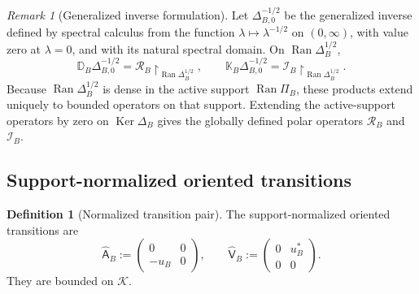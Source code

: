\documentclass[11pt,reqno]{scrartcl}
\newcommand{\scrK}{\mathscr K}
\newcommand{\Aop}{\mathsf A}
\newcommand{\Vop}{\mathsf V}
\newcommand{\DB}{\mathbb D}
\newcommand{\KB}{\mathbb K}
\newcommand{\DeltaB}{\Delta}
\DeclareMathOperator{\Ran}{Ran}
\DeclareMathOperator{\Ker}{Ker}
\newcommand{\restr}[2]{#1\!\upharpoonright_{#2}}
\theoremstyle{plain}
\theoremstyle{definition}
\newtheorem{definition}[definition]{Definition}
\theoremstyle{remark}
\newtheorem{remark}[remark]{Remark}
\begin{document}
\begin{remark}[Generalized inverse formulation]
Let \(\DeltaB_{B,0}^{-1/2}\) be the generalized inverse defined by spectral
calculus from the function \(\lambda\mapsto\lambda^{-1/2}\) on
\((0,\infty)\), with value zero at \(\lambda=0\), and with its natural
spectral domain.  On \(\Ran\DeltaB_B^{1/2}\),
\begin{equation}
  \DB_B\DeltaB_{B,0}^{-1/2}=\restr{\mathcal R_B}{\Ran\DeltaB_B^{1/2}},
  \qquad
  \KB_B\DeltaB_{B,0}^{-1/2}=\restr{\mathcal I_B}{\Ran\DeltaB_B^{1/2}}.
\end{equation}
Because \(\Ran\DeltaB_B^{1/2}\) is dense in the active support
\(\Ran\Pi_B\), these products extend uniquely to bounded operators on that
support.  Extending the active-support operators by zero on
\(\Ker\DeltaB_B\) gives the globally defined polar operators
\(\mathcal R_B\) and \(\mathcal I_B\).
\end{remark}

\subsection{Support-normalized oriented transitions}

\begin{definition}[Normalized transition pair]
\label{def:normalized-AV}
The support-normalized oriented transitions are
\begin{equation}
  \widehat{\Aop}_B
  :=\begin{pmatrix}0&0\\-u_B&0\end{pmatrix},
  \qquad
  \widehat{\Vop}_B
  :=\begin{pmatrix}0&u_B^*\\0&0\end{pmatrix}.
  \label{eq:normalized-AV}
\end{equation}
They are bounded on \(\scrK\).
\end{definition}
\end{document}
